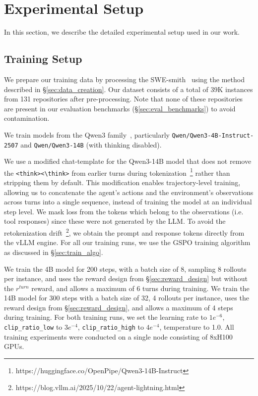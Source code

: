 
\section{Experimental Setup}
\label{sec:experiments}

In this section, we describe the detailed experimental setup used in our work.

\subsection{Training Setup}\label{sec:train_setup}

We prepare our training data by processing the SWE-smith~\citep{yang2025swesmithscalingdatasoftware} using the method described in \S\ref{sec:data_creation}. Our dataset consists of a total of 39K instances from 131 repositories after pre-processing. Note that none of these repositories are present in our evaluation benchmarks (\S\ref{sec:eval_benchmarks}) to avoid contamination.

We train models from the Qwen3 family~\citep{yang2025qwen3technicalreport}, particularly \texttt{Qwen/Qwen3-4B-Instruct-2507} and \texttt{Qwen/Qwen3-14B} (with thinking disabled). 

We use a modified chat-template for the Qwen3-14B model that does not remove the \texttt{<think><\textbackslash think>} from earlier turns during tokenization~\footnote{https://huggingface.co/OpenPipe/Qwen3-14B-Instruct} rather than stripping them by default. This modification enables trajectory-level training, allowing us to concatenate the agent’s actions and the environment’s observations across turns into a single sequence, instead of training the model at an individual step level. We mask loss from the tokens which belong to the observations (i.e. tool responses) since these were not generated by the LLM. To avoid the retokenization drift~\footnote{https://blog.vllm.ai/2025/10/22/agent-lightning.html}, we obtain the prompt and response tokens directly from the vLLM engine. For all our training runs, we use the GSPO training algorithm as discussed in \S\ref{sec:train_algo}.

We train the 4B model for 200 steps, with a batch size of 8, sampling 8 rollouts per instance, and uses the reward design from \S\ref{sec:reward_design} but without the $r^{turn}$ reward, and allows a maximum of 6 turns during training. We train the 14B model for 300 steps with a batch size of 32, 4 rollouts per instance, uses the reward design from \S\ref{sec:reward_design}, and allows a maximum of 4 steps during training. For both training runs, we set the learning rate to $1e^{-6}$, \texttt{clip\_ratio\_low} to $3e^{-4}$, \texttt{clip\_ratio\_high} to $4e^{-4}$, temperature to 1.0. All training experiments were conducted on a single node consisting of 8xH100 GPUs.

